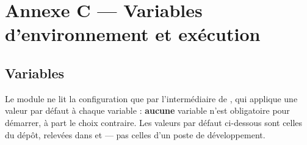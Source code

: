 \section{Annexe C --- Variables d'environnement et exécution}
\label{sec:env}

\subsection{Variables}

Le module ne lit la configuration que par l'intermédiaire de
, qui applique une valeur par défaut à chaque variable :
\textbf{aucune} variable n'est obligatoire pour démarrer, à part le choix
contraire. Les valeurs par défaut ci-dessous sont celles du dépôt, relevées dans
 et  --- pas celles d'un poste de
développement.

